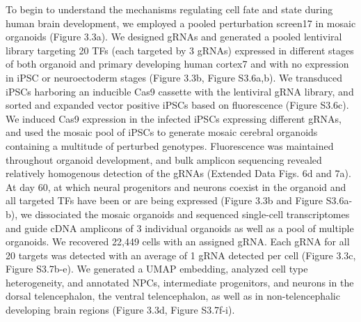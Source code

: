 To begin to understand the mechanisms regulating cell fate and state during human brain development, we employed a pooled perturbation screen17 in mosaic organoids (Figure 3.3a). We designed gRNAs and generated a pooled lentiviral library targeting 20 TFs (each targeted by 3 gRNAs) expressed in different stages of both organoid and primary developing human cortex7 and with no expression in iPSC or neuroectoderm stages (Figure 3.3b, Figure S3.6a,b). We transduced iPSCs harboring an inducible Cas9 cassette with the lentiviral gRNA library, and sorted and expanded vector positive iPSCs based on fluorescence (Figure S3.6c). We induced Cas9 expression in the infected iPSCs expressing different gRNAs, and used the mosaic pool of iPSCs to generate mosaic cerebral organoids containing a multitude of perturbed genotypes. Fluorescence was maintained throughout organoid development, and bulk amplicon sequencing revealed relatively homogenous detection of the gRNAs (Extended Data Figs. 6d and 7a). At day 60, at which neural progenitors and neurons coexist in the organoid and all targeted TFs have been or are being expressed (Figure 3.3b and Figure S3.6a-b), we dissociated the mosaic organoids and sequenced single-cell transcriptomes and guide cDNA amplicons of 3 individual organoids as well as a pool of multiple organoids. We recovered 22,449 cells with an assigned gRNA. Each gRNA for all 20 targets was detected with an average of 1 gRNA detected per cell (Figure 3.3c, Figure S3.7b-e). We generated a UMAP embedding, analyzed cell type heterogeneity, and annotated NPCs, intermediate progenitors, and neurons in the dorsal telencephalon, the ventral telencephalon, as well as in non-telencephalic developing brain regions (Figure 3.3d, Figure S3.7f-i).

